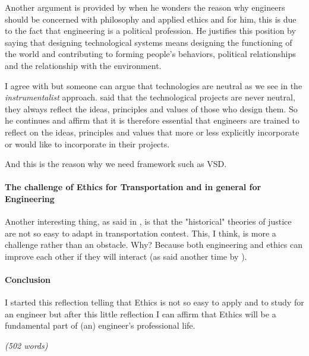 Another argument is provided by \cite{eticatrasporti} when he wonders the reason why engineers should be concerned with philosophy and applied ethics and for him, this is due to the fact that engineering is a political profession. He justifies this position by saying that designing technological systems means designing the functioning of the world and contributing to forming people's behaviors, political relationships and the relationship with the environment.

I agree with \cite{eticatrasporti} but someone can argue that technologies are neutral as we see in the \emph{instrumentalist} approach.
\cite{eticatrasporti} said that the technological projects are never neutral, they always reflect the ideas, principles and values of those who design them.  So he continues and affirm that it is therefore essential that engineers are trained to reflect on the ideas, principles and values that more or less explicitly incorporate or would like to incorporate in their projects.

And this is the reason why we need framework such as VSD.

\paragraph{The challenge of Ethics for Transportation and in general for Engineering}
Another interesting thing, as said in \cite{Pereira2017DistributiveTransportation}, is that the "historical" theories of justice are not so easy to adapt in transportation contest.
This, I think, is more a challenge rather than an obstacle. Why? Because both engineering and ethics can improve each other if they will interact (as said another time by \cite{eticatrasporti}).

\paragraph{Conclusion}
I started this reflection telling that Ethics is not so easy to apply and to study for an engineer but after this little reflection I can affirm that Ethics will be a fundamental part of (an) engineer's professional life. 

\emph{(502 words)}